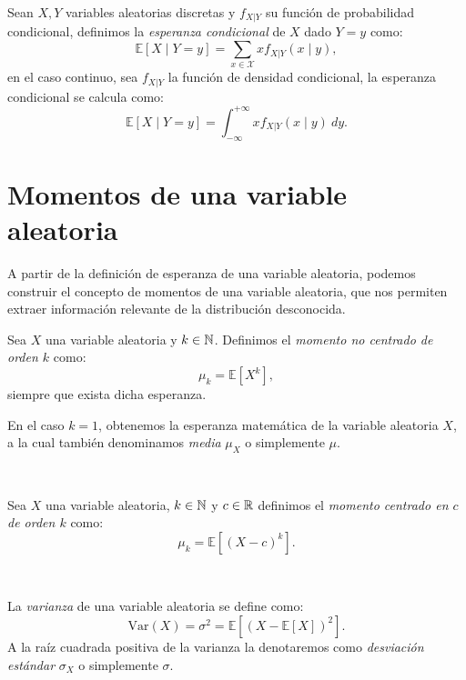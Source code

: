 \documentclass[oneside,openright,titlepage,numbers=noenddot,openany,headinclude,footinclude=true,
cleardoublepage=empty,abstractoff,BCOR=5mm,paper=a4,fontsize=12pt,main=spanish]{scrreprt}
\begin{document}
\begin{definition}
Sean $X,Y$ variables aleatorias discretas y $f_{X | Y}$ su función de probabilidad condicional, definimos la \textit{esperanza condicional} de $X$ dado $Y=y$ como: $$\mathbb{E}[X \mid Y=y]=\sum_{x\in \mathcal{X}} x f_{X | Y}(x \mid y),$$
en el caso continuo, sea $f_{X|Y}$ la función de densidad condicional, la esperanza condicional se calcula como: $$\mathbb{E}[X \mid Y=y]=\int_{-\infty}^{+\infty} x f_{X | Y}(x \mid y) \ dy.$$
\end{definition}

\clearpage

\section{Momentos de una variable aleatoria}

A partir de la definición de esperanza de una variable aleatoria, podemos construir el concepto de momentos de una variable aleatoria, que nos permiten extraer información relevante de la distribución desconocida.\\

\begin{definition}
Sea $X$ una variable aleatoria y $k\in \mathbb N$. Definimos el \textit{momento no centrado de orden $k$} como: $$\mu_k=\mathbb{E}[X^k],$$
siempre que exista dicha esperanza.\\
\begin{remark}
En el caso $k=1$, obtenemos la esperanza matemática de la variable aleatoria $X$, a la cual también denominamos \textit{media} $\mu_X$ o simplemente $\mu$.
\end{remark}
\end{definition}\

\begin{definition}
Sea $X$ una variable aleatoria, $k\in \mathbb N$ y $c\in \mathbb{R}$ definimos el \textit{momento centrado en $c$ de orden $k$} como: $$\mu_k=\mathbb{E}[(X-c)^k].$$
\end{definition}\

\begin{definition}[Varianza]
La \textit{varianza} de una variable aleatoria se define como: $$\text{Var}(X)=\sigma
^2=\mathbb{E}\left[(X-\mathbb{E}[X])^2\right].$$
A la raíz cuadrada positiva de la varianza la denotaremos como \textit{desviación estándar} $\sigma_X$ o simplemente $\sigma$.
\end{definition}\
\end{document}
